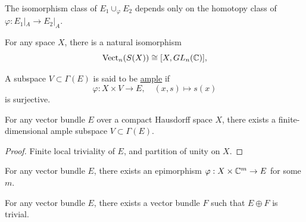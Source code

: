 \begin{lemma}
    The isomorphism class of $E_1\cup_\varphi E_2$ depends only on the homotopy
    class of $\varphi:E_1|_A\to E_2|_A$.
\end{lemma}

\begin{lemma}
    For any space $X$, there is a natural isomorphism
    \[
    \mathrm{Vect}_n(S(X))\cong [X,GL_n(\mathbb{C})],
    \]
\end{lemma}

\begin{definition}
    A subspace $V\subset\Gamma(E)$ is said to be \underline{ample} if 
    \[
    \varphi:X\times V\to E,\quad (x,s)\mapsto s(x)
    \]
    is surjective.
\end{definition}

\begin{lemma}
    For any vector bundle $E$ over a compact Hausdorff space $X$, there exists
    a finite-dimensional ample subspace $V\subset \Gamma(E)$.
\end{lemma}
\begin{proof}
    Finite local triviality of $E$, and partition of unity on $X$.
\end{proof}

\begin{corollary}
    For any vector bundle $E$, there exists an epimorphism
    $\varphi:X\times\mathbb{C}^m\to E$ for some $m$.
\end{corollary}

\begin{corollary}
    For any vector bundle $E$, there exists a vector bundle $F$ such that
    $E\oplus F$ is trivial. 
\end{corollary}
